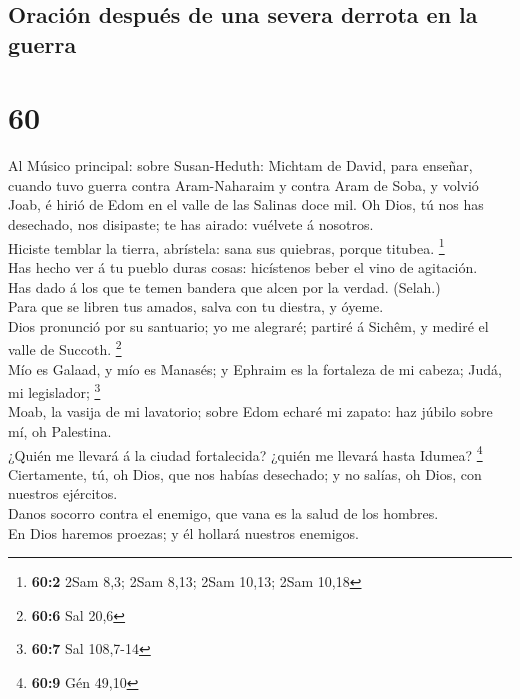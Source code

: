 \hypertarget{oraciuxf3n-despuuxe9s-de-una-severa-derrota-en-la-guerra}{%
\subsection{Oración después de una severa derrota en la
guerra}\label{oraciuxf3n-despuuxe9s-de-una-severa-derrota-en-la-guerra}}

\hypertarget{section-59}{%
\section{60}\label{section-59}}

 Al Músico principal: sobre Susan-Heduth: Michtam de
David, para enseñar, cuando tuvo guerra contra Aram-Naharaim y contra
Aram de Soba, y volvió Joab, é hirió de Edom en el valle de las Salinas
doce mil. Oh Dios, tú nos has desechado, nos disipaste; te has airado:
vuélvete á nosotros.\\
 Hiciste temblar la tierra, abrístela: sana sus quiebras,
porque titubea. \footnote{\textbf{60:2} 2Sam 8,3; 2Sam 8,13; 2Sam 10,13;
  2Sam 10,18}\\
 Has hecho ver á tu pueblo duras cosas: hicístenos beber
el vino de agitación.\\
 Has dado á los que te temen bandera que alcen por la
verdad. (Selah.)\\
 Para que se libren tus amados, salva con tu diestra, y
óyeme.\\
 Dios pronunció por su santuario; yo me alegraré; partiré
á Sichêm, y mediré el valle de Succoth. \footnote{\textbf{60:6} Sal 20,6}\\
 Mío es Galaad, y mío es Manasés; y Ephraim es la
fortaleza de mi cabeza; Judá, mi legislador; \footnote{\textbf{60:7} Sal
  108,7-14}\\
 Moab, la vasija de mi lavatorio; sobre Edom echaré mi
zapato: haz júbilo sobre mí, oh Palestina.\\
 ¿Quién me llevará á la ciudad fortalecida? ¿quién me
llevará hasta Idumea? \footnote{\textbf{60:9} Gén 49,10}\\
 Ciertamente, tú, oh Dios, que nos habías desechado; y no
salías, oh Dios, con nuestros ejércitos.\\
 Danos socorro contra el enemigo, que vana es la salud de
los hombres.\\
 En Dios haremos proezas; y él hollará nuestros enemigos.


